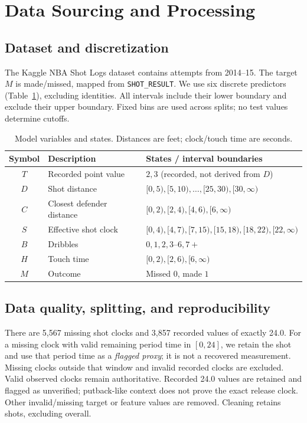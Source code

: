 \documentclass{article}
\begin{document}
\section{Data Sourcing and Processing}
\subsection{Dataset and discretization}
The Kaggle NBA Shot Logs dataset \citep{dataset} contains \RawN{} attempts from
2014--15. The target $M$ is made/missed, mapped from \texttt{SHOT\_RESULT}.
We use six discrete predictors (Table~\ref{tab:variables}), excluding identities.
All intervals include their lower boundary and exclude their upper boundary.
Fixed bins are used across splits; no test values determine cutoffs.

\begin{table}[ht]
\centering\small
\caption{Model variables and states. Distances are feet; clock/touch time are seconds.}
\label{tab:variables}
\begin{tabular}{cll}
\toprule
Symbol & Description & States / interval boundaries\\
\midrule
$T$ & Recorded point value & $2,3$ (recorded, not derived from $D$)\\
$D$ & Shot distance & $[0,5),[5,10),\ldots,[25,30),[30,\infty)$\\
$C$ & Closest defender distance & $[0,2),[2,4),[4,6),[6,\infty)$\\
$S$ & Effective shot clock & $[0,4),[4,7),[7,15),[15,18),[18,22),[22,\infty)$\\
$B$ & Dribbles & $0,1,2,3$--$6,7+$\\
$H$ & Touch time & $[0,2),[2,6),[6,\infty)$\\
$M$ & Outcome & Missed $0$, made $1$\\
\bottomrule
\end{tabular}
\end{table}

\subsection{Data quality, splitting, and reproducibility}
There are 5,567 missing shot clocks and 3,857 recorded values of exactly 24.0.
For a missing clock with valid remaining period time in $[0,24]$, we retain the
shot and use that period time as a \emph{flagged proxy}; it is not a recovered
measurement. Missing clocks outside that window and invalid recorded clocks are
excluded. Valid observed clocks remain authoritative. Recorded 24.0 values are
retained and flagged as unverified; putback-like context does not prove the exact
release clock. Other invalid/missing target or feature values are removed.
Cleaning retains \CleanN{} shots, excluding \RemovedN{} overall.
\end{document}
